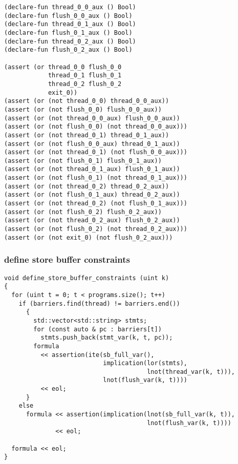 \begin{lstlisting}[language=SMTLib]
(declare-fun thread_0_0_aux () Bool)
(declare-fun flush_0_0_aux () Bool)
(declare-fun thread_0_1_aux () Bool)
(declare-fun flush_0_1_aux () Bool)
(declare-fun thread_0_2_aux () Bool)
(declare-fun flush_0_2_aux () Bool)

(assert (or thread_0_0 flush_0_0
            thread_0_1 flush_0_1
            thread_0_2 flush_0_2
            exit_0))
(assert (or (not thread_0_0) thread_0_0_aux))
(assert (or (not flush_0_0) flush_0_0_aux))
(assert (or (not thread_0_0_aux) flush_0_0_aux))
(assert (or (not flush_0_0) (not thread_0_0_aux)))
(assert (or (not thread_0_1) thread_0_1_aux))
(assert (or (not flush_0_0_aux) thread_0_1_aux))
(assert (or (not thread_0_1) (not flush_0_0_aux)))
(assert (or (not flush_0_1) flush_0_1_aux))
(assert (or (not thread_0_1_aux) flush_0_1_aux))
(assert (or (not flush_0_1) (not thread_0_1_aux)))
(assert (or (not thread_0_2) thread_0_2_aux))
(assert (or (not flush_0_1_aux) thread_0_2_aux))
(assert (or (not thread_0_2) (not flush_0_1_aux)))
(assert (or (not flush_0_2) flush_0_2_aux))
(assert (or (not thread_0_2_aux) flush_0_2_aux))
(assert (or (not flush_0_2) (not thread_0_2_aux)))
(assert (or (not exit_0) (not flush_0_2_aux)))
\end{lstlisting}

\subsubsection{define store buffer constraints}

\begin{lstlisting}[style=c++]
void define_store_buffer_constraints (uint k)
{
  for (uint t = 0; t < programs.size(); t++)
    if (barriers.find(thread) != barriers.end())
      {
        std::vector<std::string> stmts;
        for (const auto & pc : barriers[t])
          stmts.push_back(stmt_var(k, t, pc));
        formula
          << assertion(ite(sb_full_var(),
                           implication(lor(stmts),
                                       lnot(thread_var(k, t))),
                           lnot(flush_var(k, t))))
          << eol;
      }
    else
      formula << assertion(implication(lnot(sb_full_var(k, t)),
                                       lnot(flush_var(k, t))))
              << eol;

  formula << eol;
}
\end{lstlisting}

